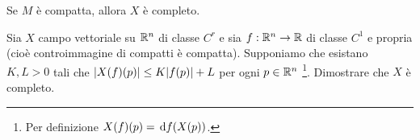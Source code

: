 \begin{corollary}
	Se $M$ è compatta, allora $X$ è completo.
\end{corollary}


\begin{exercise}
	Sia $X$ campo vettoriale su $\mathbb R^n$ di classe $C^r$ e sia $f:\mathbb R^n\to \mathbb R$ di classe $C^1$ e propria (cioè controimmagine di compatti è compatta). Supponiamo che esistano $K,L>0$ tali che $\lvert X(f)(p)\rvert\le K\lvert f(p)\rvert+L$ per ogni $p\in\mathbb R^n$ \footnote{Per definizione $X(f)(p)=\,\mathrm d f(X(p))$.}. Dimostrare che $X$ è completo. %
\end{exercise}
